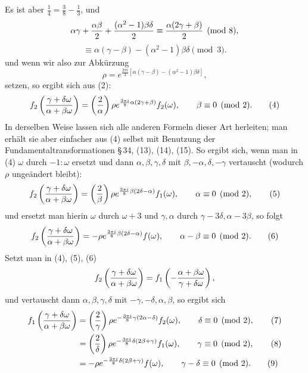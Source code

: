 \documentclass[11pt]{article}
\providecommand{\Jac}[2]{\left(\frac{#1}{#2}\right)}
\begin{document}
Es ist aber $\frac14=\frac38-\frac13$, und
\[
\alpha\gamma+{\alpha\beta\over2}+{(\alpha^2-1)\beta\delta\over2}
\equiv {\alpha(2\gamma+
\beta)\over2}\pmod 8,
\]
\[
\equiv \alpha(\gamma-\beta)-(\alpha^2-1)\beta\delta\pmod 3.
\]
und wenn wir also zur Abkürzung
\begin{equation}
\rho=e^{\frac{2\pi i}{3}[\alpha(\gamma-\beta)-(\alpha^2-1)\beta\delta]},
\tag{3}
\end{equation}
setzen, so ergibt sich aus (2):
\begin{equation}
f_2\left({\gamma+
\delta\omega\over\alpha+
\beta\omega}\right)
=\Jac{2}{\alpha}\rho e^{\frac{3\pi i}{8}\alpha(2\gamma+
\beta)}f_2(\omega),
\qquad \beta\equiv0\pmod2. 
\tag{4}
\end{equation}
In derselben Weise lassen sich alle anderen Formeln dieser Art herleiten; man erhält sie aber einfacher aus (4) selbst mit Benutzung der Fundamentaltransformationen \S\,34, (13), (14), (15). So ergibt sich, wenn man in (4) $\omega$ durch $-1:\omega$ ersetzt und dann $\alpha,\beta,\gamma,\delta$ mit $\beta,-\alpha,\delta,-\gamma$ vertauscht (wodurch $\rho$ ungeändert bleibt):
\begin{equation}
f_2\left({\gamma+
\delta\omega\over\alpha+
\beta\omega}\right)
=\Jac{2}{\beta}\rho e^{\frac{3\pi i}{8}\beta(2\delta-
\alpha)}f_1(\omega),
\qquad \alpha\equiv0\pmod2,
\tag{5}
\end{equation}
und ersetzt man hierin $\omega$ durch $\omega+3$ und $\gamma,
\alpha$ durch $\gamma-3\delta,
\alpha-3\beta$, so folgt
\begin{equation}
f_2\left({\gamma+
\delta\omega\over\alpha+
\beta\omega}\right)
=-\rho e^{\frac{3\pi i}{8}\beta(2\delta-
\alpha)}f(\omega),
\qquad \alpha-
\beta\equiv0\pmod2. 
\tag{6}
\end{equation}
Setzt man in (4), (5), (6)
\[
f_2\left({\gamma+
\delta\omega\over\alpha+
\beta\omega}\right)
=f_1\left(-{\alpha+
\beta\omega\over\gamma+
\delta\omega}\right),
\]
und vertauscht dann $\alpha,\beta,\gamma,\delta$ mit $-\gamma,-\delta,\alpha,\beta$, so ergibt sich
\begin{align}
f_1\left({\gamma+
\delta\omega\over\alpha+
\beta\omega}\right)
&=\Jac{2}{\gamma}\rho e^{-\frac{3\pi i}{8}\gamma(2\alpha-
\delta)}f_2(\omega),
\qquad \delta\equiv0\pmod2, \tag{7}\\
&=\Jac{2}{\delta}\rho e^{-\frac{3\pi i}{8}\delta(2\beta+
\gamma)}f_1(\omega),
\qquad \gamma\equiv0\pmod2, \tag{8}\\
&=-\rho e^{-\frac{3\pi i}{8}\delta(2\beta+
\gamma)}f(\omega),
\qquad \gamma-
\delta\equiv0\pmod2. \tag{9}
\end{align}
\end{document}
